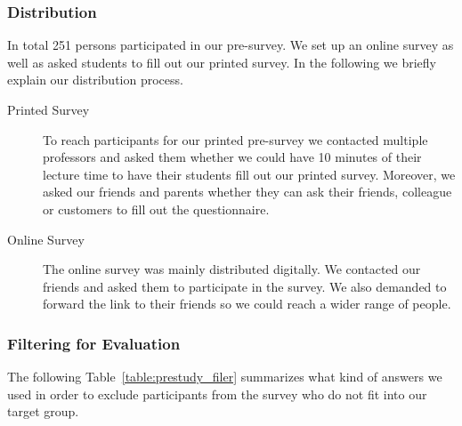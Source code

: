 \subsubsection{Distribution}
In total 251 persons participated in our pre-survey. We set up an online survey as well as asked students to fill out our printed survey. In the following we briefly explain our distribution process.

\begin{description}
	\item[Printed Survey] To reach participants for our printed pre-survey we contacted multiple professors and asked them whether we could have 10 minutes of their lecture time to have their students fill out our printed survey. Moreover, we asked our friends and parents whether they can ask their friends, colleague or customers to fill out the questionnaire.
	\item[Online Survey] The online survey was mainly distributed digitally. We contacted our friends and asked them to participate in the survey. We also demanded to forward the link to their friends so we could reach a wider range of people.
\end{description}

\subsubsection{Filtering for Evaluation}

The following Table~\ref{table:prestudy_filer} summarizes what kind of answers we used in order to exclude participants from the survey who do not fit into our target group.


